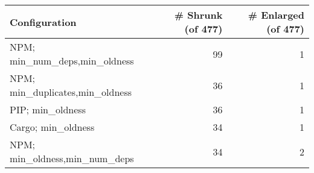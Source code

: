 \begin{table}[ht]
\centering
\begin{tabular}{lrr}
  \hline
Configuration & \# Shrunk (of 477) & \# Enlarged (of 477) \\ 
  \hline
NPM; min\_num\_deps,min\_oldness &  99 &   1 \\ 
  NPM; min\_duplicates,min\_oldness &  36 &   1 \\ 
  PIP; min\_oldness &  36 &   1 \\ 
  Cargo; min\_oldness &  34 &   1 \\ 
  NPM; min\_oldness,min\_num\_deps &  34 &   2 \\ 
   \hline
\end{tabular}
\end{table}
